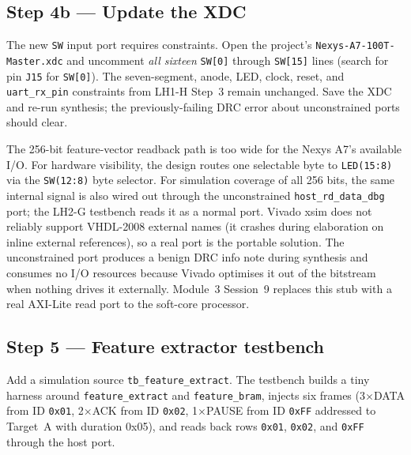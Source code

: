 \documentclass[11pt,letterpaper]{article}
\begin{document}
\subsection{Step 4b --- Update the XDC}

The new \texttt{SW} input port requires constraints. Open the project's \texttt{Nexys-A7-100T-Master.xdc} and uncomment \emph{all sixteen} \texttt{SW[0]} through \texttt{SW[15]} lines (search for pin \texttt{J15} for \texttt{SW[0]}). The seven-segment, anode, LED, clock, reset, and \texttt{uart\_rx\_pin} constraints from LH1-H Step~3 remain unchanged. Save the XDC and re-run synthesis; the previously-failing DRC error about unconstrained ports should clear.

\begin{tcolorbox}[infobox={Why \texttt{host\_rd\_data\_dbg} exists}]
The 256-bit feature-vector readback path is too wide for the Nexys A7's available I/O. For hardware visibility, the design routes one selectable byte to \texttt{LED(15:8)} via the \texttt{SW(12:8)} byte selector. For simulation coverage of all 256 bits, the same internal signal is also wired out through the unconstrained \texttt{host\_rd\_data\_dbg} port; the LH2-G testbench reads it as a normal port. Vivado xsim does not reliably support VHDL-2008 external names (it crashes during elaboration on inline external references), so a real port is the portable solution. The unconstrained port produces a benign DRC info note during synthesis and consumes no I/O resources because Vivado optimises it out of the bitstream when nothing drives it externally. Module~3 Session~9 replaces this stub with a real \mbox{AXI}-Lite read port to the soft-core processor.
\end{tcolorbox}


\subsection{Step 5 --- Feature extractor testbench}

Add a simulation source \texttt{tb\_feature\_extract}. The testbench builds a tiny harness around \texttt{feature\_extract} and \texttt{feature\_bram}, injects six frames (3$\times$DATA from ID \texttt{0x01}, 2$\times$ACK from ID \texttt{0x02}, 1$\times$PAUSE from ID \texttt{0xFF} addressed to Target~A with duration 0x05), and reads back rows \texttt{0x01}, \texttt{0x02}, and \texttt{0xFF} through the host port.
\end{document}
